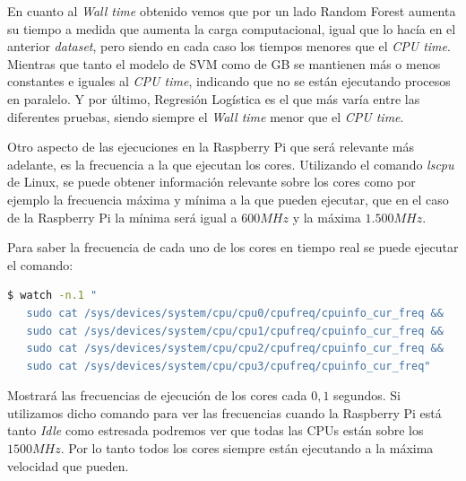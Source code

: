 \documentclass[a4paper, 12pt]{book}
\begin{document}
En cuanto al \textit{Wall time} obtenido vemos que por un lado Random Forest aumenta su tiempo a medida que aumenta la carga computacional, igual que lo hacía en el anterior \textit{dataset}, pero siendo en cada caso los tiempos menores que el \textit{CPU time}. Mientras que tanto el modelo de SVM como de GB se mantienen más o menos constantes e iguales al \textit{CPU time}, indicando que no se están ejecutando procesos en paralelo. Y por último, Regresión Logística es el que más varía entre las diferentes pruebas, siendo siempre el \textit{Wall time} menor que el \textit{CPU time}.

Otro aspecto de las ejecuciones en la Raspberry Pi que será relevante más adelante, es la frecuencia a la que ejecutan los cores. Utilizando el comando \textit{lscpu} de Linux, se puede obtener información relevante sobre los cores como por ejemplo la frecuencia máxima y mínima a la que pueden ejecutar, que en el caso de la Raspberry Pi la mínima será igual a $600MHz$ y la máxima $1.500MHz$. 

Para saber la frecuencia de cada uno de los cores en tiempo real se puede ejecutar el comando:\\

\begin{lstlisting}[language=bash, showstringspaces=false]
   $ watch -n.1 "
   sudo cat /sys/devices/system/cpu/cpu0/cpufreq/cpuinfo_cur_freq && 
   sudo cat /sys/devices/system/cpu/cpu1/cpufreq/cpuinfo_cur_freq && 
   sudo cat /sys/devices/system/cpu/cpu2/cpufreq/cpuinfo_cur_freq && 
   sudo cat /sys/devices/system/cpu/cpu3/cpufreq/cpuinfo_cur_freq"
\end{lstlisting}

Mostrará las frecuencias de ejecución de los cores cada $0,1$ segundos. Si utilizamos dicho comando para ver las frecuencias cuando la Raspberry Pi está tanto \textit{Idle} como estresada podremos ver que todas las CPUs están sobre los $1500MHz$. Por lo tanto todos los cores siempre están ejecutando a la máxima velocidad que pueden.
\end{document}
